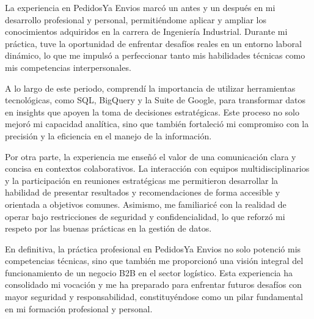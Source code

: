 La experiencia en PedidosYa Envios marcó un antes y un después en mi desarrollo profesional y personal, permitiéndome aplicar y ampliar los conocimientos adquiridos en la carrera de Ingeniería Industrial. Durante mi práctica, tuve la oportunidad de enfrentar desafíos reales en un entorno laboral dinámico, lo que me impulsó a perfeccionar tanto mis habilidades técnicas como mis competencias interpersonales.

A lo largo de este periodo, comprendí la importancia de utilizar herramientas tecnológicas, como SQL, BigQuery y la Suite de Google, para transformar datos en insights que apoyen la toma de decisiones estratégicas. Este proceso no solo mejoró mi capacidad analítica, sino que también fortaleció mi compromiso con la precisión y la eficiencia en el manejo de la información.

Por otra parte, la experiencia me enseñó el valor de una comunicación clara y concisa en contextos colaborativos. La interacción con equipos multidisciplinarios y la participación en reuniones estratégicas me permitieron desarrollar la habilidad de presentar resultados y recomendaciones de forma accesible y orientada a objetivos comunes. Asimismo, me familiaricé con la realidad de operar bajo restricciones de seguridad y confidencialidad, lo que reforzó mi respeto por las buenas prácticas en la gestión de datos.

En definitiva, la práctica profesional en PedidosYa Envios no solo potenció mis competencias técnicas, sino que también me proporcionó una visión integral del funcionamiento de un negocio B2B en el sector logístico. Esta experiencia ha consolidado mi vocación y me ha preparado para enfrentar futuros desafíos con mayor seguridad y responsabilidad, constituyéndose como un pilar fundamental en mi formación profesional y personal.
